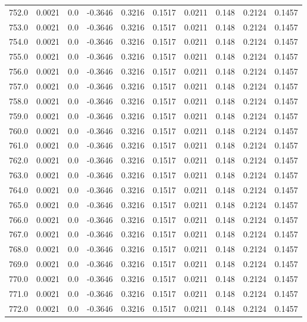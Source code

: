 \begin{longtable}{lrrrrrrrrr}
752.0 & 0.0021 & 0.0 & -0.3646 & 0.3216 & 0.1517 & 0.0211 & 0.148 & 0.2124 & 0.1457 \\
753.0 & 0.0021 & 0.0 & -0.3646 & 0.3216 & 0.1517 & 0.0211 & 0.148 & 0.2124 & 0.1457 \\
754.0 & 0.0021 & 0.0 & -0.3646 & 0.3216 & 0.1517 & 0.0211 & 0.148 & 0.2124 & 0.1457 \\
755.0 & 0.0021 & 0.0 & -0.3646 & 0.3216 & 0.1517 & 0.0211 & 0.148 & 0.2124 & 0.1457 \\
756.0 & 0.0021 & 0.0 & -0.3646 & 0.3216 & 0.1517 & 0.0211 & 0.148 & 0.2124 & 0.1457 \\
757.0 & 0.0021 & 0.0 & -0.3646 & 0.3216 & 0.1517 & 0.0211 & 0.148 & 0.2124 & 0.1457 \\
758.0 & 0.0021 & 0.0 & -0.3646 & 0.3216 & 0.1517 & 0.0211 & 0.148 & 0.2124 & 0.1457 \\
759.0 & 0.0021 & 0.0 & -0.3646 & 0.3216 & 0.1517 & 0.0211 & 0.148 & 0.2124 & 0.1457 \\
760.0 & 0.0021 & 0.0 & -0.3646 & 0.3216 & 0.1517 & 0.0211 & 0.148 & 0.2124 & 0.1457 \\
761.0 & 0.0021 & 0.0 & -0.3646 & 0.3216 & 0.1517 & 0.0211 & 0.148 & 0.2124 & 0.1457 \\
762.0 & 0.0021 & 0.0 & -0.3646 & 0.3216 & 0.1517 & 0.0211 & 0.148 & 0.2124 & 0.1457 \\
763.0 & 0.0021 & 0.0 & -0.3646 & 0.3216 & 0.1517 & 0.0211 & 0.148 & 0.2124 & 0.1457 \\
764.0 & 0.0021 & 0.0 & -0.3646 & 0.3216 & 0.1517 & 0.0211 & 0.148 & 0.2124 & 0.1457 \\
765.0 & 0.0021 & 0.0 & -0.3646 & 0.3216 & 0.1517 & 0.0211 & 0.148 & 0.2124 & 0.1457 \\
766.0 & 0.0021 & 0.0 & -0.3646 & 0.3216 & 0.1517 & 0.0211 & 0.148 & 0.2124 & 0.1457 \\
767.0 & 0.0021 & 0.0 & -0.3646 & 0.3216 & 0.1517 & 0.0211 & 0.148 & 0.2124 & 0.1457 \\
768.0 & 0.0021 & 0.0 & -0.3646 & 0.3216 & 0.1517 & 0.0211 & 0.148 & 0.2124 & 0.1457 \\
769.0 & 0.0021 & 0.0 & -0.3646 & 0.3216 & 0.1517 & 0.0211 & 0.148 & 0.2124 & 0.1457 \\
770.0 & 0.0021 & 0.0 & -0.3646 & 0.3216 & 0.1517 & 0.0211 & 0.148 & 0.2124 & 0.1457 \\
771.0 & 0.0021 & 0.0 & -0.3646 & 0.3216 & 0.1517 & 0.0211 & 0.148 & 0.2124 & 0.1457 \\
772.0 & 0.0021 & 0.0 & -0.3646 & 0.3216 & 0.1517 & 0.0211 & 0.148 & 0.2124 & 0.1457 \\

\end{longtable}
